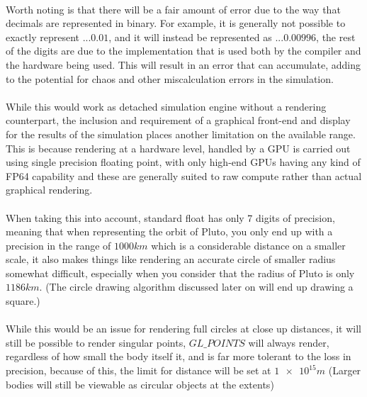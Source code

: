\paragraph{}
Worth noting is that there will be a fair amount of error due to the way that decimals are represented in binary. For example, it is generally not possible to exactly represent $...0.01$, and it will instead be represented as $...0.00996$, the rest of the digits are due to the implementation that is used both by the compiler and the hardware being used. This will result in an error that can accumulate, adding to the potential for chaos and other miscalculation errors in the simulation. 

\paragraph{}
While this would work as detached simulation engine without a rendering counterpart, the inclusion and requirement of a graphical front-end and display for the results of the simulation places another limitation on the available range. This is because rendering at a hardware level, handled by a GPU is carried out using single precision floating point, with only high-end GPUs having any kind of FP64 capability and these are generally suited to raw compute rather than actual graphical rendering.

\paragraph{}
When taking this into account, standard float has only 7 digits of precision, meaning that when representing the orbit of Pluto, you only end up with a precision in the range of $1000 km$ which is a considerable distance on a smaller scale, it also makes things like rendering an accurate circle of smaller radius somewhat difficult, especially when you consider that the radius of Pluto is only $1186 km$. (The circle drawing algorithm discussed later on will end up drawing a square.)

\paragraph{}
While this would be an issue for rendering full circles at close up distances, it will still be possible to render singular points, $GL\_POINTS$ will always render, regardless of how small the body itself it, and is far more tolerant to the loss in precision, because of this, the limit for distance will be set at $\num{1e15}m$ (Larger bodies will still be viewable as circular objects at the extents)

